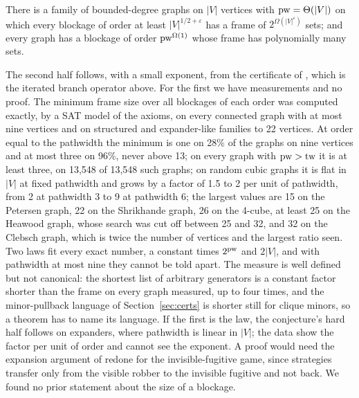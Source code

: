 \begin{conjecture}\label{conj:blockage-size}
There is a family of bounded-degree graphs on $|V|$ vertices with
$\mathrm{pw}=\Theta(|V|)$ on which every blockage of order at least
$|V|^{1/2+\varepsilon}$ has a frame of $2^{\Omega(|V|^{\varepsilon})}$ sets;
and every graph has a blockage of order $\mathrm{pw}^{\Omega(1)}$ whose frame has
polynomially many sets.
\end{conjecture}

The second half follows, with a small exponent, from the certificate of
\citet{GroenlandJoretNadaraWalczak2023}, which is the iterated branch
operator above. For the first we have measurements and no proof. The
minimum frame size over all blockages of each order was computed exactly, by
a SAT model of the axioms, on every connected graph with at most nine
vertices and on structured and expander-like families to 22 vertices. At
order equal to the pathwidth the minimum is one on 28\% of the graphs on
nine vertices and at most three on 96\%, never above 13; on every graph with
$\mathrm{pw}>\mathrm{tw}$ it is at least three, on 13,548 of 13,548 such graphs; on random
cubic graphs it is flat in $|V|$ at fixed pathwidth and grows by a factor of
1.5 to 2 per unit of pathwidth, from 2 at pathwidth 3 to 9 at pathwidth 6;
the largest values are 15 on the Petersen graph, 22 on the Shrikhande graph,
26 on the 4-cube, at least 25 on the Heawood graph, whose search was cut off
between 25 and 32, and 32 on the Clebsch graph, which is twice the number of
vertices and the largest ratio seen. Two laws fit every exact number, a
constant times $2^{\mathrm{pw}}$ and $2|V|$, and with pathwidth at most nine they
cannot be told apart. The measure is well defined but not canonical: the
shortest list of arbitrary generators is a constant factor shorter than the
frame on every graph measured, up to four times, and the minor-pullback
language of Section~\ref{sec:certs} is shorter still for clique minors, so
a theorem has to name its language. If the
first is the law, the conjecture's hard half follows on expanders, where
pathwidth is linear in $|V|$; the data show the factor per unit of order and
cannot see the exponent. A proof would need the expansion argument of
\citet{GroheMarx2009} redone for the invisible-fugitive game, since
strategies transfer only from the visible robber to the invisible fugitive
and not back. We found no prior statement about the size of a blockage.
